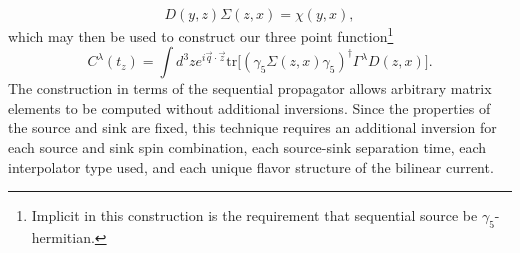 \documentclass[prd,12pt,superscriptaddress,tightenlines,nofootinbib]{revtex4}
\DeclareMathOperator{\tr}{tr}
\def\G{{\Gamma}}
\def\l{{\lambda}}
\def\tr{\text{tr}}
\begin{document}
\begin{equation}
D (y,z) \Sigma (z,x) = \chi (y,x),
\end{equation}
which may then be used to construct our three point function\footnote{Implicit in this construction is the requirement that sequential source be $\gamma_5$-hermitian. }
\begin{equation}
C^\l (t_z) = \int d^3 z  e^{i \vec{q} \cdot \vec{z}} \tr\Big[ \left( \gamma_{5} \Sigma(z,x) \gamma_{5}\right)^{\dagger} \G^\l D(z,x) \Big].
\end{equation}
The construction in terms of the sequential propagator allows arbitrary matrix elements to be computed without additional inversions. Since the properties of the source and sink are fixed, this technique requires an additional inversion for each source and sink spin combination, each source-sink separation time, each interpolator type used, and each unique flavor structure of the bilinear current. 
\end{document}
